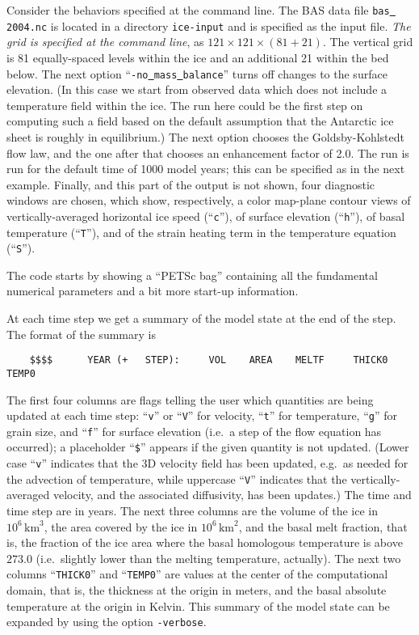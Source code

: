 \documentclass[11pt,final]{amsart}
\renewcommand{\t}[1]{\texttt{#1}}
\begin{document}
Consider the behaviors specified at the command line.  The BAS data file \t{bas\underline{ }2004.nc} is located in a directory \t{ice-input} and is specified as the input file.  \emph{The grid is specified at the command line}, as $121\times 121 \times (81+21)$.  The vertical grid is 81 equally-spaced levels within the ice and an additional 21 within the bed below.  The next option ``\t{-no\underline{ }mass\underline{ }balance}'' turns off changes to the surface elevation.  (In this case we start from observed data which does not include a temperature field within the ice.  The run here could be the first step on computing such a field based on the default assumption that the Antarctic ice sheet is roughly in equilibrium.)  The next option chooses the Goldsby-Kohlstedt \cite{GoldsbyKohlstedt} flow law, and the one after that chooses an enhancement factor of 2.0.  The run is run for the default time of 1000 model years; this can be specified as in the next example.  Finally, and this part of the output is not shown, four diagnostic windows are chosen, which show, respectively, a color map-plane contour views of vertically-averaged horizontal ice speed (``\t{c}''), of surface elevation (``\t{h}''), of basal temperature (``\t{T}''), and of the strain heating term in the temperature equation (``\t{S}'').

The code starts by showing a ``PETSc bag'' containing all the fundamental numerical parameters and a bit more start-up information.

At each time step we get a summary of the model state at the end of the step.  The format of the summary is
\scriptsize\begin{verbatim}
    $$$$      YEAR (+   STEP):     VOL    AREA    MELTF     THICK0     TEMP0
\end{verbatim}
\normalsize
The first four columns are flags telling the user which quantities are being updated at each time step: ``\texttt{v}'' or ``\texttt{V}'' for velocity, ``\texttt{t}'' for temperature, ``\texttt{g}'' for grain size, and ``\texttt{f}'' for surface elevation (i.e.~a step of the flow equation has occurred); a placeholder ``\verb|$|'' appears if the given quantity is not updated.  (Lower case ``\texttt{v}'' indicates that the 3D velocity field has been updated, e.g.~as needed for the advection of temperature, while uppercase ``\texttt{V}'' indicates that the vertically-averaged velocity, and the associated diffusivity, has been updates.)  The time and time step are in years.  The next three columns are the volume of the ice in $10^6 \,\text{km}^3$, the area covered by the ice in $10^6\,\text{km}^2$, and the basal melt fraction, that is, the fraction of the ice area where the basal homologous temperature is above $273.0$ (i.e.~slightly lower than the melting temperature, actually).  The next two columns ``\texttt{THICK0}'' and ``\texttt{TEMP0}'' are values at the center of the computational domain, that is, the thickness at the origin in meters, and the basal absolute temperature at the origin in Kelvin.  This summary of the model state can be expanded by using the option \verb|-verbose|.
\end{document}
